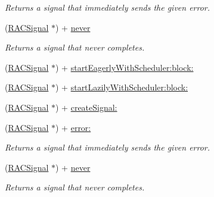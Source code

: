 \begin{DoxyCompactItemize}
\begin{DoxyCompactList}\small\item\em Returns a signal that immediately sends the given error. \end{DoxyCompactList}\item 
\mbox{\label{interface_r_a_c_signal_a27a1b1106a2543dcd472467a7c364dc7}} 
(\mbox{\hyperlink{interface_r_a_c_signal}{R\+A\+C\+Signal}} $\ast$) + \mbox{\hyperlink{interface_r_a_c_signal_a27a1b1106a2543dcd472467a7c364dc7}{never}}
\begin{DoxyCompactList}\small\item\em Returns a signal that never completes. \end{DoxyCompactList}\item 
(\mbox{\hyperlink{interface_r_a_c_signal}{R\+A\+C\+Signal}} $\ast$) + \mbox{\hyperlink{interface_r_a_c_signal_a6bee49e8a8ee2f41bcec31bb86948b37}{start\+Eagerly\+With\+Scheduler\+:block\+:}}
\item 
(\mbox{\hyperlink{interface_r_a_c_signal}{R\+A\+C\+Signal}} $\ast$) + \mbox{\hyperlink{interface_r_a_c_signal_adbef9afea68ea6a2a81bb3115f47c22c}{start\+Lazily\+With\+Scheduler\+:block\+:}}
\item 
(\mbox{\hyperlink{interface_r_a_c_signal}{R\+A\+C\+Signal}} $\ast$) + \mbox{\hyperlink{interface_r_a_c_signal_a4ba374f148d6e2a0339c4f4202b4dc26}{create\+Signal\+:}}
\item 
\mbox{\label{interface_r_a_c_signal_aedd4ad7b4b8c1f7b26d41b5be6c83d83}} 
(\mbox{\hyperlink{interface_r_a_c_signal}{R\+A\+C\+Signal}} $\ast$) + \mbox{\hyperlink{interface_r_a_c_signal_aedd4ad7b4b8c1f7b26d41b5be6c83d83}{error\+:}}
\begin{DoxyCompactList}\small\item\em Returns a signal that immediately sends the given error. \end{DoxyCompactList}\item 
\mbox{\label{interface_r_a_c_signal_a27a1b1106a2543dcd472467a7c364dc7}} 
(\mbox{\hyperlink{interface_r_a_c_signal}{R\+A\+C\+Signal}} $\ast$) + \mbox{\hyperlink{interface_r_a_c_signal_a27a1b1106a2543dcd472467a7c364dc7}{never}}
\begin{DoxyCompactList}\small\item\em Returns a signal that never completes. \end{DoxyCompactList}\item 

\end{DoxyCompactItemize}
